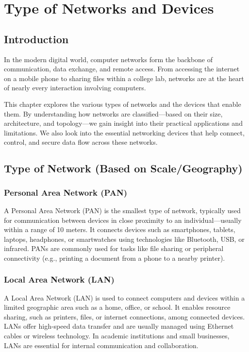\chapter{Type of Networks and Devices}

\section{Introduction}
In the modern digital world, computer networks form the backbone of communication, data exchange, and remote access. From accessing the internet on a mobile phone to sharing files within a college lab, networks are at the heart of nearly every interaction involving computers.

This chapter explores the various types of networks and the devices that enable them. By understanding how networks are classified—based on their size, architecture, and topology—we gain insight into their practical applications and limitations. We also look into the essential networking devices that help connect, control, and secure data flow across these networks.

\section{Type of Network (Based on Scale/Geography)}

\subsection{Personal Area Network (PAN)}
A Personal Area Network (PAN) is the smallest type of network, typically used for communication between devices in close proximity to an individual—usually within a range of 10 meters. It connects devices such as smartphones, tablets, laptops, headphones, or smartwatches using technologies like Bluetooth, USB, or infrared. PANs are commonly used for tasks like file sharing or peripheral connectivity (e.g., printing a document from a phone to a nearby printer).

\subsection{Local Area Network (LAN)}
A Local Area Network (LAN) is used to connect computers and devices within a limited geographic area such as a home, office, or school. It enables resource sharing, such as printers, files, or internet connections, among connected devices. LANs offer high-speed data transfer and are usually managed using Ethernet cables or wireless technology. In academic institutions and small businesses, LANs are essential for internal communication and collaboration.

